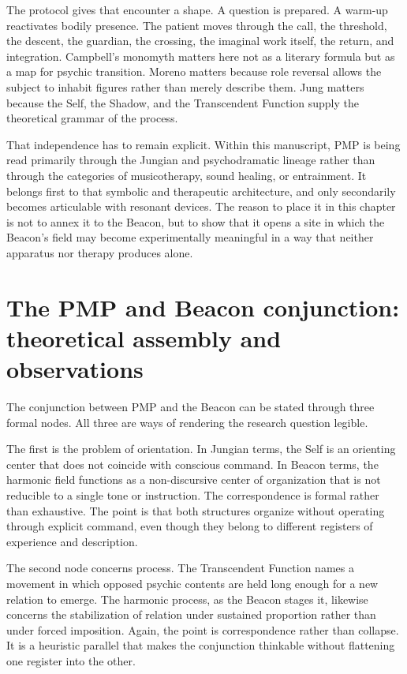 The protocol gives that encounter a shape. A question is prepared. A warm-up reactivates bodily presence. The patient moves through the call, the threshold, the descent, the guardian, the crossing, the imaginal work itself, the return, and integration. Campbell's monomyth matters here not as a literary formula but as a map for psychic transition. Moreno matters because role reversal allows the subject to inhabit figures rather than merely describe them. Jung matters because the Self, the Shadow, and the Transcendent Function supply the theoretical grammar of the process. 

That independence has to remain explicit. Within this manuscript, PMP is being read primarily through the Jungian and psychodramatic lineage rather than through the categories of musicotherapy, sound healing, or entrainment. It belongs first to that symbolic and therapeutic architecture, and only secondarily becomes articulable with resonant devices. The reason to place it in this chapter is not to annex it to the Beacon, but to show that it opens a site in which the Beacon's field may become experimentally meaningful in a way that neither apparatus nor therapy produces alone.


\section{The PMP and Beacon conjunction: theoretical assembly and observations}


The conjunction between PMP and the Beacon can be stated through three formal nodes. All three are ways of rendering the research question legible.

The first is the problem of orientation. In Jungian terms, the Self is an orienting center that does not coincide with conscious command. In Beacon terms, the harmonic field functions as a non-discursive center of organization that is not reducible to a single tone or instruction. The correspondence is formal rather than exhaustive. The point is that both structures organize without operating through explicit command, even though they belong to different registers of experience and description.

The second node concerns process. The Transcendent Function names a movement in which opposed psychic contents are held long enough for a new relation to emerge. The harmonic process, as the Beacon stages it, likewise concerns the stabilization of relation under sustained proportion rather than under forced imposition. Again, the point is correspondence rather than collapse. It is a heuristic parallel that makes the conjunction thinkable without flattening one register into the other.

